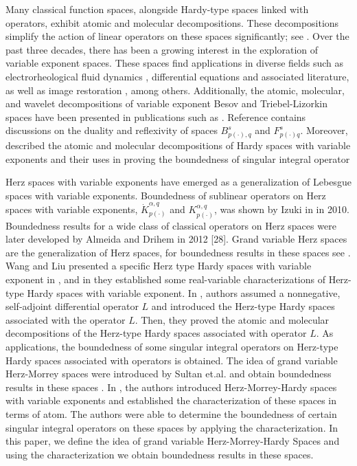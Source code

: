 \documentclass[oneside,reqno]{amsart}
\numberwithin{equation}{section}
\theoremstyle{definition}
\begin{document}
\medskip

Many classical function spaces, alongside Hardy-type spaces linked with operators, exhibit atomic and molecular decompositions. These decompositions simplify the action of linear operators on these spaces significantly; see \cite{chai20, chai23, chai24, chai28, chai29, chai30}. Over the past three decades, there has been a growing interest in the exploration of variable exponent spaces. These spaces find applications in diverse fields such as electrorheological fluid dynamics \cite{xu7}, differential equations \cite{xu8} and associated literature, as well as image restoration \cite{xu9,xu10,xu11}, among others. Additionally, the atomic, molecular, and wavelet decompositions of variable exponent Besov and Triebel-Lizorkin spaces have been presented in publications such as  \cite{xu13,xu14,xu20,xu21,xu24}. Reference \cite{xu25} contains discussions on the duality and reflexivity of spaces $B_{p(\cdot), q}^{s}$ and $F_{p(\cdot) q}^{s}$. Moreover, \cite{xu22,xu26} described the atomic and molecular decompositions of Hardy spaces with variable exponents and their uses in proving the boundedness of singular integral operator


\medskip

 Herz spaces with variable exponents have emerged as a generalization of Lebesgue spaces with variable exponents. Boundedness of sublinear operators on Herz spaces with variable exponents, $\dot{K}_{p(\cdot)}^{\alpha, q}$ and $K_{p(\cdot)}^{\alpha, q}$, was shown by Izuki in \cite{n17} in 2010. Boundedness results for a wide class of classical operators on Herz spaces were later developed by Almeida and Drihem in 2012 [28].  Grand variable Herz spaces are the generalization of Herz spaces, for boundedness results in these spaces see \cite{ babargh2,  babargh4}. 
 Wang and Liu presented a specific Herz type Hardy spaces with variable exponent in \cite{xu31}, and in \cite{zliu} they established some real-variable characterizations of Herz-type Hardy spaces with variable exponent. In \cite{yanchai}, authors assumed   a nonnegative, self-adjoint differential operator $L$ and  introduced the Herz-type Hardy spaces associated with  the operator $L$. Then,  they proved the atomic and molecular decompositions of the Herz-type Hardy spaces associated with operator $L$. As applications, the boundedness of some singular integral operators on Herz-type Hardy spaces associated with operators is obtained. The idea of grand variable Herz-Morrey spaces were introduced by Sultan et.al. and obtain boundedness results in these spaces \cite{ghm1, ghm2,  ghm4}. In \cite{hmh},  the authors introduced Herz-Morrey-Hardy spaces with variable exponents and established the characterization of these spaces in terms of atom. The authors were able to determine the boundedness of certain singular integral operators on these spaces by applying the characterization. In this paper, we define the idea of grand variable Herz-Morrey-Hardy Spaces  and using the characterization we obtain boundedness results in these spaces.
\end{document}
